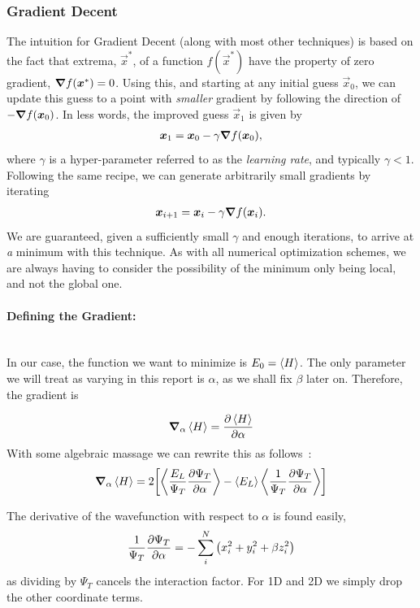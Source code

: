 \documentclass[twocolumn]{article}
\begin{document}
\subsubsection{Gradient Decent}

The intuition for Gradient Decent (along with most other techniques) is based on
the fact that extrema, $\vec x^*$, of a function $f(\vec x^*)$ have the property of zero gradient,
$\grad f(\bm x^*) = 0$. Using this, and starting at any initial guess $\vec
x_0$, we can update this guess to a point with \textit{smaller} gradient by
following the direction of $-\grad f(\bm x_0)$. In less words, the improved
guess $\vec x_1$ is given by
\begin{align}
    \bm x_1 = \bm x_0 - \gamma \grad f(\bm x_0),
\end{align}
where $\gamma$ is a hyper-parameter referred to as the \textit{learning rate},
and typically $\gamma < 1$.
Following the same recipe, we can generate arbitrarily small gradients by
iterating
\begin{align}
    \bm x_{i+1} = \bm x_i - \gamma \grad f(\bm x_i).
\end{align}
We are guaranteed, given a sufficiently small $\gamma$ and enough iterations, to
arrive at \textit{a} minimum with this technique. As with all numerical
optimization schemes, we are always having to consider the possibility of the
minimum only being local, and not the global one. 

\paragraph{Defining the Gradient:}$\,$\\

In our case, the function we want to minimize is $E_0=\expval{H}$. The only
parameter we will treat as varying in this report is $\alpha$, as we shall fix
$\beta$ later on. Therefore, the gradient is

\begin{align}
    \grad_\alpha \expval{H} = \pdv{\expval{H}}{\alpha}
\end{align}
With some algebraic massage we can rewrite this as
follows~\cite{mhj-compphys-II}:
\begin{align}
    \grad_\alpha \expval{H} =
    2\qty[\expval{\frac{E_L}{\Psi_T}\pdv{\Psi_T}{\alpha}} -
    \expval{E_L}\expval{\frac{1}{\Psi_T}\pdv{\Psi_T}{\alpha}}]\label{eq:gradient-nice}
\end{align}

The derivative of the wavefunction with respect to $\alpha$ is found easily,
\begin{align}
    \frac{1}{\Psi_T}\pdv{\Psi_T}{\alpha} = -\sum_{i}^N\qty(x_i^2 + y_i^2+\beta
    z_i^2)
\end{align}
as dividing by $\Psi_T$ cancels the interaction factor. For 1D and 2D we simply
drop the other coordinate terms.
\end{document}
